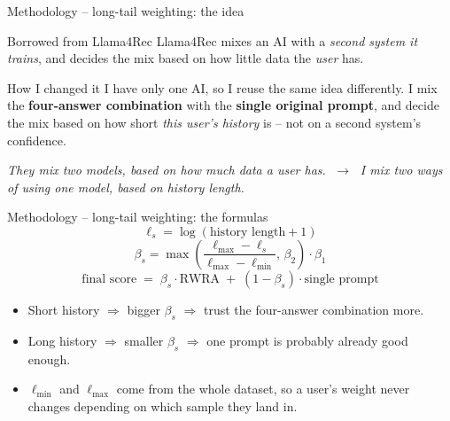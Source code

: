 \documentclass[aspectratio=169,12pt]{beamer}
\begin{document}
\begin{frame}{Methodology -- long-tail weighting: the idea}
\begin{alertblock}{Borrowed from Llama4Rec}
Llama4Rec mixes an AI with a \emph{second system it trains}, and decides
the mix based on how little data the \emph{user} has.
\end{alertblock}

\vspace{0.8em}
\begin{block}{How I changed it}
I have only one AI, so I reuse the same idea differently. I mix the
\textbf{four-answer combination} with the \textbf{single original prompt},
and decide the mix based on how short \emph{this user's history} is -- not
on a second system's confidence.
\end{block}

\vspace{0.5em}
\centering
\textcolor{DeepBlue}{\emph{They mix two models, based on how much data a user has.}
$\;\longrightarrow\;$
\emph{I mix two ways of using one model, based on history length.}}
\end{frame}

\begin{frame}{Methodology -- long-tail weighting: the formulas}
\[
\ell_s = \log(\text{history length}+1)
\]
\[
\beta_s = \max\!\left(\frac{\ell_{\max}-\ell_s}{\ell_{\max}-\ell_{\min}},\,\beta_2\right)\cdot\beta_1
\]
\[
\text{final score} \;=\; \beta_s \cdot \text{RWRA} \;+\; (1-\beta_s)\cdot \text{single prompt}
\]

\vspace{0.5em}
\begin{itemize}
  \item Short history $\Rightarrow$ bigger $\beta_s$ $\Rightarrow$ trust
        the four-answer combination more.
  \item Long history $\Rightarrow$ smaller $\beta_s$ $\Rightarrow$ one
        prompt is probably already good enough.
  \item $\ell_{\min}$ and $\ell_{\max}$ come from the whole dataset, so a
        user's weight never changes depending on which sample they land in.
\end{itemize}
\end{frame}
\end{document}

